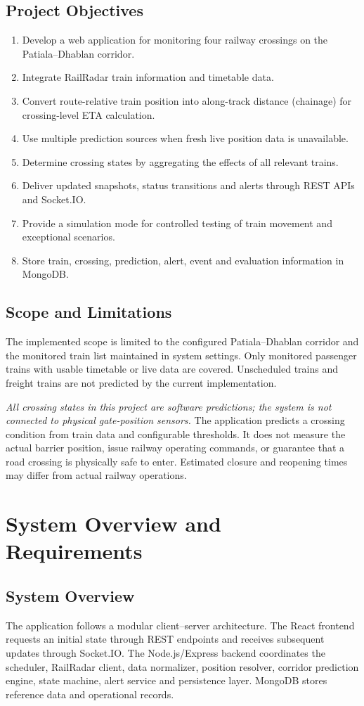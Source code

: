 \documentclass[11pt,a4paper]{report}
\newcommand{\statusnote}{\textit{All crossing states in this project are software predictions; the system is not connected to physical gate-position sensors.}}
\begin{document}
\section{Project Objectives}
\begin{enumerate}
  \item Develop a web application for monitoring four railway crossings on the Patiala--Dhablan corridor.
  \item Integrate RailRadar train information and timetable data.
  \item Convert route-relative train position into along-track distance (chainage) for crossing-level ETA calculation.
  \item Use multiple prediction sources when fresh live position data is unavailable.
  \item Determine crossing states by aggregating the effects of all relevant trains.
  \item Deliver updated snapshots, status transitions and alerts through REST APIs and Socket.IO.
  \item Provide a simulation mode for controlled testing of train movement and exceptional scenarios.
  \item Store train, crossing, prediction, alert, event and evaluation information in MongoDB.
\end{enumerate}

\section{Scope and Limitations}
The implemented scope is limited to the configured Patiala--Dhablan corridor and the monitored train list maintained in system settings. Only monitored passenger trains with usable timetable or live data are covered. Unscheduled trains and freight trains are not predicted by the current implementation.

\statusnote{} The application predicts a crossing condition from train data and configurable thresholds. It does not measure the actual barrier position, issue railway operating commands, or guarantee that a road crossing is physically safe to enter. Estimated closure and reopening times may differ from actual railway operations.

\chapter{System Overview and Requirements}
\section{System Overview}
The application follows a modular client--server architecture. The React frontend requests an initial state through REST endpoints and receives subsequent updates through Socket.IO. The Node.js/Express backend coordinates the scheduler, RailRadar client, data normalizer, position resolver, corridor prediction engine, state machine, alert service and persistence layer. MongoDB stores reference data and operational records.
\end{document}
